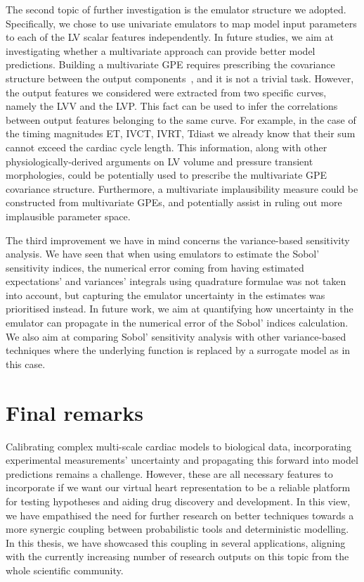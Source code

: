 \vspace{0.2cm}
The second topic of further investigation is the emulator structure we adopted. Specifically, we chose to use univariate emulators to map model input parameters to each of the LV scalar features independently. In future studies, we aim at investigating whether a multivariate approach can provide better model predictions. Building a multivariate GPE requires prescribing the covariance structure between the output components~\cite{Bonilla:2008,Rougier:2008,Conti:2010}, and it is not a trivial task. However, the output features we considered were extracted from two specific curves, namely the LVV and the LVP. This fact can be used to infer the correlations between output features belonging to the same curve. For example, in the case of the timing magnitudes ET, IVCT, IVRT, Tdiast we already know that their sum cannot exceed the cardiac cycle length. This information, along with other physiologically-derived arguments on LV volume and pressure transient morphologies, could be potentially used to prescribe the multivariate GPE covariance structure. Furthermore, a multivariate implausibility measure could be constructed from multivariate GPEs, and potentially assist in ruling out more implausible parameter space.

\vspace{0.2cm}
The third improvement we have in mind concerns the variance-based sensitivity analysis. We have seen that when using emulators to estimate the Sobol' sensitivity indices, the numerical error coming from having estimated expectations' and variances' integrals using quadrature formulae was not taken into account, but capturing the emulator uncertainty in the estimates was prioritised instead. In future work, we aim at quantifying how uncertainty in the emulator can propagate in the numerical error of the Sobol' indices calculation. We also aim at comparing Sobol' sensitivity analysis with other variance-based techniques where the underlying function is replaced by a surrogate model as in this case.


%
%
%
\section{Final remarks}\label{sec:ch9conclusions}
Calibrating complex multi-scale cardiac models to biological data, incorporating experimental measurements' uncertainty and propagating this forward into model predictions remains a challenge. However, these are all necessary features to incorporate if we want our virtual heart representation to be a reliable platform for testing hypotheses and aiding drug discovery and development. In this view, we have empathised the need for further research on better techniques towards a more synergic coupling between probabilistic tools and deterministic modelling. In this thesis, we have showcased this coupling in several applications, aligning with the currently increasing number of research outputs on this topic from the whole scientific community.